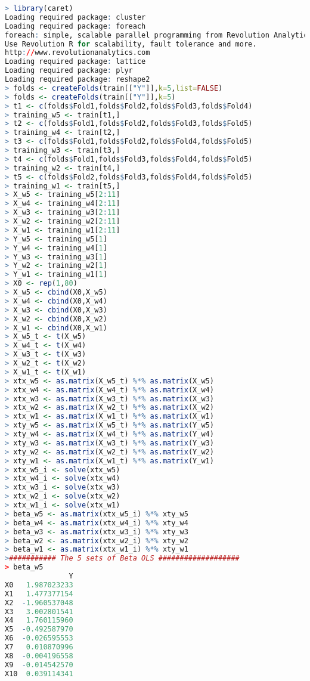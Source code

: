 \documentclass[fontsize=10pt,DIV=14]{scrartcl}
\begin{document}
\begin{enumerate}
\begin{itemize}
			\begin{lstlisting}[language=R,frame=single]
> library(caret)
Loading required package: cluster
Loading required package: foreach
foreach: simple, scalable parallel programming from Revolution Analytics
Use Revolution R for scalability, fault tolerance and more.
http://www.revolutionanalytics.com
Loading required package: lattice
Loading required package: plyr
Loading required package: reshape2
> folds <- createFolds(train[["Y"]],k=5,list=FALSE)
> folds <- createFolds(train[["Y"]],k=5)
> t1 <- c(folds$Fold1,folds$Fold2,folds$Fold3,folds$Fold4)
> training_w5 <- train[t1,]
> t2 <- c(folds$Fold1,folds$Fold2,folds$Fold3,folds$Fold5)
> training_w4 <- train[t2,]
> t3 <- c(folds$Fold1,folds$Fold2,folds$Fold4,folds$Fold5)
> training_w3 <- train[t3,]
> t4 <- c(folds$Fold1,folds$Fold3,folds$Fold4,folds$Fold5)
> training_w2 <- train[t4,]
> t5 <- c(folds$Fold2,folds$Fold3,folds$Fold4,folds$Fold5)
> training_w1 <- train[t5,]
> X_w5 <- training_w5[2:11]
> X_w4 <- training_w4[2:11]
> X_w3 <- training_w3[2:11]
> X_w2 <- training_w2[2:11]
> X_w1 <- training_w1[2:11]
> Y_w5 <- training_w5[1]
> Y_w4 <- training_w4[1]
> Y_w3 <- training_w3[1]
> Y_w2 <- training_w2[1]
> Y_w1 <- training_w1[1]
> X0 <- rep(1,80)
> X_w5 <- cbind(X0,X_w5)
> X_w4 <- cbind(X0,X_w4)
> X_w3 <- cbind(X0,X_w3)
> X_w2 <- cbind(X0,X_w2)
> X_w1 <- cbind(X0,X_w1)
> X_w5_t <- t(X_w5)
> X_w4_t <- t(X_w4)
> X_w3_t <- t(X_w3)
> X_w2_t <- t(X_w2)
> X_w1_t <- t(X_w1)
> xtx_w5 <- as.matrix(X_w5_t) %*% as.matrix(X_w5)
> xtx_w4 <- as.matrix(X_w4_t) %*% as.matrix(X_w4)
> xtx_w3 <- as.matrix(X_w3_t) %*% as.matrix(X_w3)
> xtx_w2 <- as.matrix(X_w2_t) %*% as.matrix(X_w2)
> xtx_w1 <- as.matrix(X_w1_t) %*% as.matrix(X_w1)
> xty_w5 <- as.matrix(X_w5_t) %*% as.matrix(Y_w5)
> xty_w4 <- as.matrix(X_w4_t) %*% as.matrix(Y_w4)
> xty_w3 <- as.matrix(X_w3_t) %*% as.matrix(Y_w3)
> xty_w2 <- as.matrix(X_w2_t) %*% as.matrix(Y_w2)
> xty_w1 <- as.matrix(X_w1_t) %*% as.matrix(Y_w1)
> xtx_w5_i <- solve(xtx_w5)
> xtx_w4_i <- solve(xtx_w4)
> xtx_w3_i <- solve(xtx_w3)
> xtx_w2_i <- solve(xtx_w2)
> xtx_w1_i <- solve(xtx_w1)
> beta_w5 <- as.matrix(xtx_w5_i) %*% xty_w5
> beta_w4 <- as.matrix(xtx_w4_i) %*% xty_w4
> beta_w3 <- as.matrix(xtx_w3_i) %*% xty_w3
> beta_w2 <- as.matrix(xtx_w2_i) %*% xty_w2
> beta_w1 <- as.matrix(xtx_w1_i) %*% xty_w1
>########### The 5 sets of Beta OLS ###################
> beta_w5
               Y
X0   1.987023233
X1   1.477377154
X2  -1.960537048
X3   3.002801541
X4   1.760115960
X5  -0.492587970
X6  -0.026595553
X7   0.010870996
X8  -0.004196558
X9  -0.014542570
X10  0.039114341

\end{lstlisting}
\end{itemize}
\end{enumerate}
\end{document}
